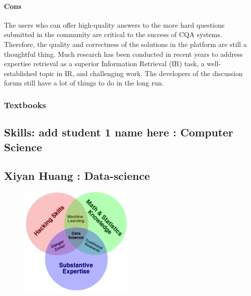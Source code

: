 \documentclass[a4paper, 11pt]{report}
\begin{document}
\paragraph{Cons}
The users who can offer high-quality answers to the more hard questions submitted in the community are critical to the success of CQA systems. \cite{(Dargahi Nobari et al., 2020)} Therefore, the quality and correctness of the solutions in the platform are still a thoughtful thing. Much research has been conducted in recent years to address expertise retrieval as a superior Information Retrieval (IR) task, a well-established topic in IR, and challenging work. \cite{(Dargahi Nobari et al., 2020)} The developers of the discussion forum still have a lot of things to do in the long run.
\subsubsection{Textbooks}


\newpage
\subsection{Skills: add student 1 name here : Computer Science}




\newpage
\subsection{Xiyan Huang : Data-science}

 \begin{figure}[t]
   \caption{\cite{(Conway, 2010)}}
      \centering
      \includegraphics[width=0.5\textwidth]{Data-science}
   \end{figure}
\end{document}
